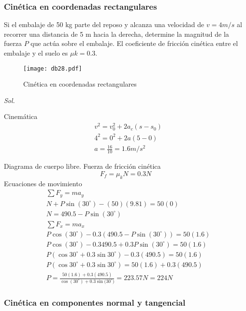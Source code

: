 \subsubsection{Cinética en coordenadas rectangulares}

\begin{example}
    Si el embalaje de 50 kg parte del reposo y alcanza una velocidad de $v=4 m/s$ al recorrer una distancia de 5 m hacia la derecha, determine la magnitud de la fuerza $P$ que actúa sobre el embalaje. El coeficiente de fricción cinética entre el embalaje y el suelo es $\mu k = 0.3$.
\end{example}

\begin{figure}[h!]
\centering
  \texttt{[image: db28.pdf]}
  \caption{Cinética en coordenadas rectangulares}
  \label{db28}
\end{figure}

\textit{ Sol. }

Cinemática
\begin{align*}
    &v^2=v^2_0+2a_c(s-s_0)\\
    &4^2=0^2+2a(5-0)\\
    &a=\frac{16}{10}=1.6m/s^2
\end{align*}

Diagrama de cuerpo libre. Fuerza de fricción cinética
\begin{equation*}
    F_f=\mu_k N=0.3N
\end{equation*}
Ecuaciones de movimiento
\begin{align*}
    &\sum F_y=ma_y\\
    &N+P\sin{(30^{\circ})}-(50)(9.81)=50(0)\\
    &N=490.5-P\sin{(30^{\circ})}\\
    &\sum F_x=ma_x\\
    &P\cos{(30^{\circ})}-0.3(490.5-P\sin{(30^{\circ})})=50(1.6)\\
    &P\cos{(30^{\circ})}-0.3 490.5 + 0.3P \sin{(30^{\circ})} = 50(1.6)\\
    &P \left(\cos 30^{\circ} + 0.3\sin{30^{\circ}}\right) - 0.3(490.5)=50(1.6)\\
    &P\left(\cos 30^{\circ} + 0.3 \sin 30^{\circ}\right) = 50 (1.6) + 0.3 (490.5)\\
    &P=\frac{50(1.6)+0.3(490.5)}{\cos{(30^{\circ})+0.3\sin{(30^{\circ}})}}=223.57N=224N
\end{align*}

\subsubsection{Cinética en componentes normal y tangencial}

